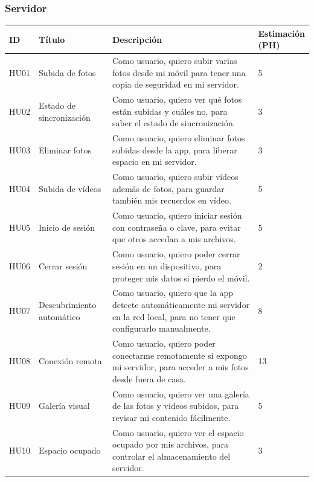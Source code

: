 \subsubsection{Servidor}
\renewcommand{\arraystretch}{1.3} %

\begin{tabularx}{\textwidth}{|l|l|>{\raggedright\arraybackslash}X|l|}
    \hline
\textbf{ID} & \textbf{Título} & \textbf{Descripción} & \makecell{\textbf{Estimación}\\\textbf{(PH)}} \\
    \hline
    HU01 & Subida de fotos & Como usuario, quiero subir varias fotos desde mi móvil para tener una copia de seguridad en mi servidor. & 5 \\
    \hline
    HU02 & Estado de sincronización & Como usuario, quiero ver qué fotos están subidas y cuáles no, para saber el estado de sincronización. & 3 \\
    \hline
    HU03 & Eliminar fotos & Como usuario, quiero eliminar fotos subidas desde la app, para liberar espacio en mi servidor. & 3 \\
    \hline
    HU04 & Subida de vídeos & Como usuario, quiero subir vídeos además de fotos, para guardar también mis recuerdos en vídeo. & 5 \\
    \hline
    HU05 & Inicio de sesión & Como usuario, quiero iniciar sesión con contraseña o clave, para evitar que otros accedan a mis archivos. & 5 \\
    \hline
    HU06 & Cerrar sesión & Como usuario, quiero poder cerrar sesión en un dispositivo, para proteger mis datos si pierdo el móvil. & 2 \\
    \hline
    HU07 & Descubrimiento automático & Como usuario, quiero que la app detecte automáticamente mi servidor en la red local, para no tener que configurarlo manualmente. & 8 \\
    \hline
    HU08 & Conexión remota & Como usuario, quiero poder conectarme remotamente si expongo mi servidor, para acceder a mis fotos desde fuera de casa. & 13 \\
    \hline
    HU09 & Galería visual & Como usuario, quiero ver una galería de las fotos y videos subidos, para revisar mi contenido fácilmente. & 5 \\
    \hline
    HU10 & Espacio ocupado & Como usuario, quiero ver el espacio ocupado por mis archivos, para controlar el almacenamiento del servidor. & 3 \\

\end{tabularx}
